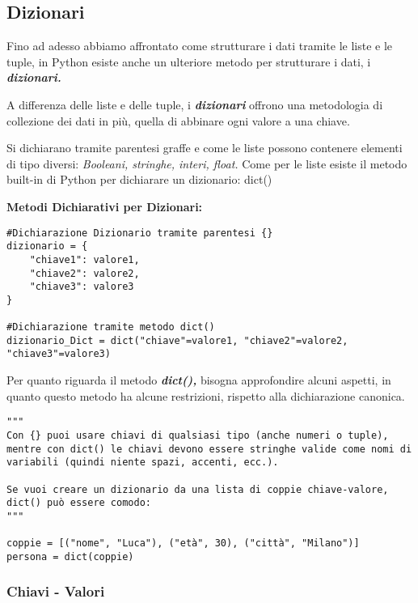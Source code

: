 \subsection{Dizionari}\label{IncipitDizionari}

Fino ad adesso abbiamo affrontato come strutturare i dati tramite le liste e le tuple, in Python esiste anche un ulteriore metodo per strutturare i dati, i \textit{\textbf{dizionari.}}

A differenza delle liste e delle tuple, i \textit{\textbf{dizionari}} offrono una metodologia di collezione dei dati in più, quella di abbinare ogni valore a una chiave.

Si dichiarano tramite parentesi graffe \textit{\textbf{{}}} e come le liste possono contenere elementi di tipo diversi: \textit{Booleani, stringhe, interi, float.} Come per le liste esiste il metodo built-in di Python per dichiarare un dizionario: dict()

\vspace{0.5cm}
\textbf{Metodi Dichiarativi per Dizionari:}
\begin{lstlisting}
#Dichiarazione Dizionario tramite parentesi {}
dizionario = {
    "chiave1": valore1,
    "chiave2": valore2,
    "chiave3": valore3
}

#Dichiarazione tramite metodo dict()
dizionario_Dict = dict("chiave"=valore1, "chiave2"=valore2, "chiave3"=valore3)
\end{lstlisting}
\vspace{0.5cm}
Per quanto riguarda il metodo \textit{\textbf{dict(),}} bisogna approfondire alcuni aspetti, in quanto questo metodo ha alcune restrizioni, rispetto alla dichiarazione canonica.

\vspace{0.5cm}
\begin{lstlisting}
"""
Con {} puoi usare chiavi di qualsiasi tipo (anche numeri o tuple), mentre con dict() le chiavi devono essere stringhe valide come nomi di variabili (quindi niente spazi, accenti, ecc.).

Se vuoi creare un dizionario da una lista di coppie chiave-valore, dict() può essere comodo:
"""

coppie = [("nome", "Luca"), ("età", 30), ("città", "Milano")]
persona = dict(coppie)

\end{lstlisting}



\subsubsection{Chiavi - Valori}\label{ChiaveValoreDizionari}

